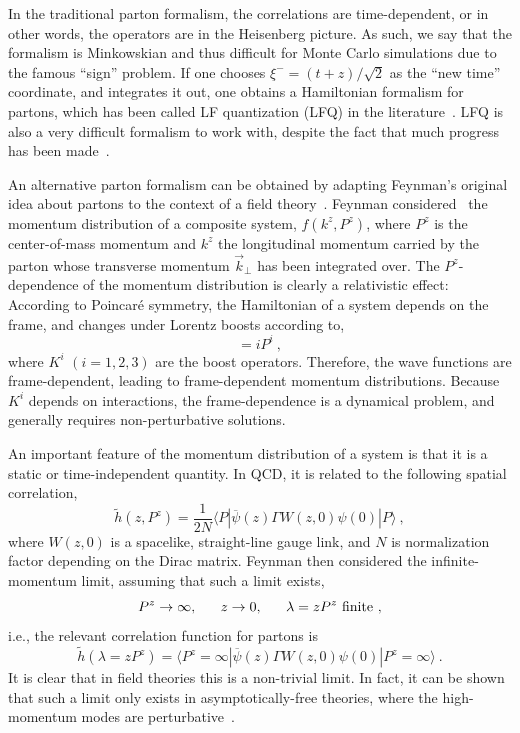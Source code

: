 In the traditional parton formalism, the correlations are time-dependent, or in other words, the operators are in the Heisenberg picture. As such, we say that the formalism
is Minkowskian and thus difficult for Monte Carlo simulations due to
the famous ``sign'' problem. If one chooses
$\xi^- = (t+z)/\sqrt{2}$ as the ``new time'' coordinate,
and integrates it out, one obtains a Hamiltonian formalism
for partons, which has been called LF quantization (LFQ) in the
literature~\cite{Dirac:1949cp}. LFQ
is also a very difficult formalism to work with, despite the fact that
much progress has been made~\cite{Brodsky:1997de}.

An alternative parton formalism can be obtained
by adapting Feynman's original idea about partons
to the context of a field theory~\cite{Ji:2014gla,Ji:2020ect}.
Feynman considered~\cite{Feynman:1973xc} the momentum distribution of a composite system,
$f(k^z, P^z)$, where $P^z$ is the center-of-mass momentum and $k^z$ the longitudinal momentum carried by the parton whose
transverse momentum $\vec{k}_\perp$ has been integrated over.
The $P^z$-dependence of the momentum distribution is clearly
a relativistic effect: According to Poincar\'e symmetry,
the Hamiltonian of a system depends on the frame, and changes under Lorentz boosts
according to,
\begin{equation}
  [H, K^i] = i P^i\ ,
\end{equation}
where $K^i$ $(i = 1,2,3)$ are the boost operators. Therefore,
the wave functions are frame-dependent, leading to frame-dependent
momentum distributions. Because $K^i$ depends on interactions, the
frame-dependence is a dynamical problem, and generally requires
non-perturbative solutions.

An important feature of the momentum distribution of a system is that it is a static or time-independent quantity. In QCD,
it is related to the following spatial correlation,
\begin{equation}
    \tilde h(z,P^z)= \frac{1}{2N}\langle P|\overline \psi(z)\Gamma W(z, 0)\psi(0)|P\rangle \ ,
\label{eq:esme}
\end{equation}
where $W(z,0)$ is a spacelike, straight-line gauge link, and $N$ is normalization factor depending on the Dirac matrix.
Feynman then considered the infinite-momentum limit, assuming that such a limit
exists,
\begin{equation}
  P^z \to \infty, ~~~~~z\to 0, ~~~~~\lambda = zP^z ~{\rm finite}\ ,
\end{equation}
i.e., the relevant correlation function for partons is
\begin{equation}
  \tilde h(\lambda= zP^z) = \langle P^z=\infty|\overline \psi(z)\Gamma W(z, 0)\psi(0)|P^z=\infty\rangle\ .
\label{Eq:correlatione}
\end{equation}
It is clear that in field theories this is a non-trivial limit. In fact,
it can be shown that such a limit only exists in asymptotically-free theories, where
the high-momentum modes are perturbative~\cite{Ji:2020ect}.

